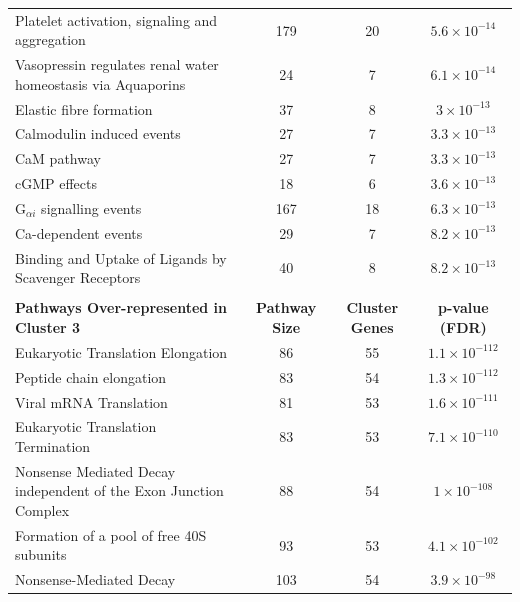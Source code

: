 \begin{table}[!Hp]
{\begin{tabular}{lccc}
  \rowcolor{Cluster_Green!15} 
  Platelet activation, signaling and aggregation & 179 &  20 & $5.6 \times 10^{-14}$ \\ 
  \rowcolor{Cluster_Green!20} 
  Vasopressin regulates renal water homeostasis via Aquaporins &  24 &   7 & $6.1 \times 10^{-14}$ \\ 
  \rowcolor{Cluster_Green!15} 
  Elastic fibre formation &  37 &   8 & $3 \times 10^{-13}$ \\ 
  \rowcolor{Cluster_Green!20} 
  Calmodulin induced events &  27 &   7 & $3.3 \times 10^{-13}$ \\ 
  \rowcolor{Cluster_Green!15} 
  CaM pathway &  27 &   7 & $3.3 \times 10^{-13}$ \\ 
  \rowcolor{Cluster_Green!20} 
  cGMP effects &  18 &   6 & $3.6 \times 10^{-13}$ \\ 
  \rowcolor{Cluster_Green!15} 
  G$_{\alpha i}$ signalling events & 167 &  18 & $6.3 \times 10^{-13}$ \\ 
  \rowcolor{Cluster_Green!20} 
  Ca-dependent events &  29 &   7 & $8.2 \times 10^{-13}$ \\ 
  \rowcolor{Cluster_Green!15} 
  Binding and Uptake of Ligands by Scavenger Receptors &  40 &   8 & $8.2 \times 10^{-13}$ \\ 
  \hline
  \\
  \cellcolor{white} \large{\textbf{Pathways Over-represented in Cluster 3}} & \large{\textbf{Pathway Size}} & \large{\textbf{Cluster Genes}} & \large{\textbf{p-value (FDR)}} \\ %
  \hline
  \rowcolor{Cluster_Orange!30}
  Eukaryotic Translation Elongation &  86 &  55 & $1.1 \times 10^{-112}$ \\ 
  \rowcolor{Cluster_Orange!20} 
  Peptide chain elongation &  83 &  54 & $1.3 \times 10^{-112}$ \\ 
  \rowcolor{Cluster_Orange!30} 
  Viral mRNA Translation &  81 &  53 & $1.6 \times 10^{-111}$ \\ 
  \rowcolor{Cluster_Orange!20} 
  Eukaryotic Translation Termination &  83 &  53 & $7.1 \times 10^{-110}$ \\ 
  \rowcolor{Cluster_Orange!30} 
  Nonsense Mediated Decay independent of the Exon Junction Complex &  88 &  54 & $1 \times 10^{-108}$ \\ 
  \rowcolor{Cluster_Orange!20} 
  Formation of a pool of free 40S subunits &  93 &  53 & $4.1 \times 10^{-102}$ \\ 
  \rowcolor{Cluster_Orange!30} 
  Nonsense-Mediated Decay & 103 &  54 & $3.9 \times 10^{-98}$ \\ 

\end{tabular}}
\end{table}
